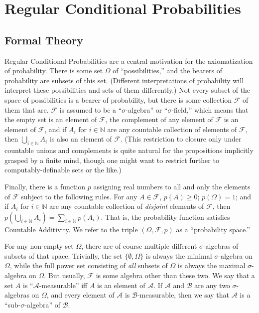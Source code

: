 \section{Regular Conditional Probabilities}\label{regular}

\subsection{Formal Theory}\label{formal}

Regular Conditional Probabilities are a central motivation for the \citet{kolmogorov} axiomatization of probability. There is some set $\Omega$ of ``possibilities,'' and the bearers of probability are subsets of this set. (Different interpretations of probability will interpret these possibilities and sets of them differently.) Not every subset of the space of possibilities is a bearer of probability, but there is some collection $\mathcal{F}$ of them that are. $\mathcal{F}$ is assumed to be a ``$\sigma$-algebra'' or ``$\sigma$-field,'' which means that the empty set is an element of $\mathcal{F}$, the complement of any element of $\mathcal{F}$ is an element of $\mathcal{F}$, and if $A_i$ for $i\in\mathbb{N}$ are any countable collection of elements of $\mathcal{F}$, then $\bigcup_{i\in\mathbb{N}}A_i$ is also an element of $\mathcal{F}$. (This restriction to closure only under countable unions and complements is quite natural for the propositions implicitly grasped by a finite mind, though one might want to restrict further to computably-definable sets or the like.)

Finally, there is a function $p$ assigning real numbers to all and only the elements of $\mathcal{F}$ subject to the following rules. For any $A\in\mathcal{F}$, $p(A)\geq 0$; $p(\Omega)=1$; and if $A_i$ for $i\in\mathbb{N}$ are any countable collection of \emph{disjoint} elements of $\mathcal{F}$, then $p(\bigcup_{i\in\mathbb{N}}A_i)=\sum_{i\in\mathbb{N}}p(A_i)$. That is, the probability function satisfies Countable Additivity. We refer to the triple $(\Omega,\mathcal{F},p)$ as a ``probability space.''

For any non-empty set $\Omega$, there are of course multiple different $\sigma$-algebras of subsets of that space. Trivially, the set $\{\emptyset,\Omega\}$ is always the minimal $\sigma$-algebra on $\Omega$, while the full power set consisting of \emph{all} subsets of $\Omega$ is always the maximal $\sigma$-algebra on $\Omega$. But usually, $\mathcal{F}$ is some algebra other than these two. We say that a set $A$ is ``$\mathcal{A}$-measurable'' iff $A$ is an element of $\mathcal{A}$. If $\mathcal{A}$ and $\mathcal{B}$ are any two $\sigma$-algebras on $\Omega$, and every element of $\mathcal{A}$ is $\mathcal{B}$-measurable, then we say that $\mathcal{A}$ is a ``sub-$\sigma$-algebra'' of $\mathcal{B}$.

